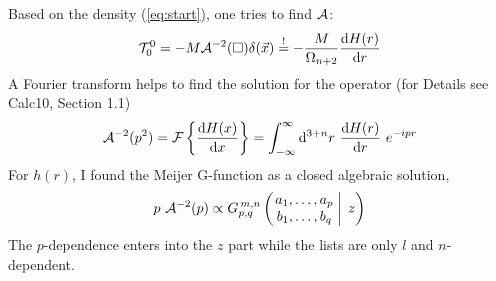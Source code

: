 \documentclass[10pt,a4paper, fleqn]{article}
\begin{document}
Based on the density (\ref{eq:start}), one tries to find ${\cal A}$:
%
\begin{equation}
{\cal T}^0_0 = -M {\cal A}^{-2}(\square) \delta(\vec x)
\stackrel{!}{=} - \frac M{\Omega_{n+2}} \frac{\mathrm{d} H(r)}{\mathrm{d} r}  \label{eq:TA}
\end{equation}
%
A Fourier transform helps to find the solution for the operator (for Details see Calc10, Section 1.1)
%
\begin{equation}
{\cal A}^{-2}(p^2) = {\cal F} \left\{ \frac{\mathrm{d} H(x)}{\mathrm{d} x} \right\}
= \int_{-\infty}^\infty \mathrm{d}^{3+n} r~\frac{\mathrm{d} H(r)}{\mathrm{d} r}~e^{-ipr}
\end{equation}
%
For $h(r)$, I found the Meijer G-function as a closed algebraic solution, 
%
\begin{equation}
p~{\cal A}^{-2}(p) \propto G_{p,q}^{\,m,n} \left( \left. \begin{matrix} a_1, \dots, a_p \\ b_1, \dots, b_q \end{matrix}\; \right| \; z \right)
\end{equation}
%
The $p$-dependence enters into the $z$ part while the lists are only $l$ and $n$-dependent.
\end{document}
